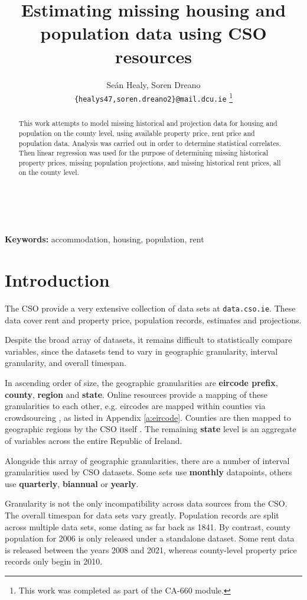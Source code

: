 \documentclass[twocolumn]{article}
\title{Estimating missing housing and population data using CSO resources}
\author{
    Seán Healy, Soren Dreano\\
    \texttt{\{healys47,soren.dreano2\}@mail.dcu.ie}
    \footnote{This work was completed as part of the CA-660 module.}
}
\begin{document}
\maketitle
\begin{abstract}
This work attempts to model missing historical and projection data for
housing and population on the county level, using available
property price, rent price and population data.  Analysis was
carried out in order to determine statistical correlates.  Then linear
regression was used for the purpose of determining missing historical property
prices, missing population projections, and missing historical rent prices,
all on the county level.
\end{abstract}\\\\
{\bf Keywords:} accommodation, housing, population, rent

\section{Introduction\label{s:intro}}
The CSO provide a very extensive collection of data sets at
{\tt data.cso.ie}.  These data cover rent and property price, population
records, estimates and projections.

Despite the broad array of datasets, it remains difficult to statistically
compare variables, since the datasets tend to vary in geographic granularity,
interval granularity, and overall timespan.

In ascending order of size, the geographic granularities are {\bf eircode prefix},
{\bf county}, {\bf region} and {\bf state}.  Online resources provide a mapping of
these granularities to each other, e.g. eircodes are mapped within counties via crowdsourcing
\cite{eircode19}, as listed in Appendix \ref{a:eircode}.  Counties are then mapped to geographic
regions by the CSO itself \cite{cso_regions}.  The remaining {\bf state} level is an aggregate of variables
across the entire Republic of Ireland.

Alongside this array of geographic granularities, there are a number of interval granularities used by CSO
datasets.  Some sets use {\bf monthly} datapoints, others use {\bf quarterly}, {\bf biannual} or {\bf yearly}.

Granularity is not the only incompatibility across data sources from the CSO.
The overall timespan for data sets vary greatly.  Population records are split
across multiple data sets, some dating as far back as 1841.  By contrast,
county population for 2006 is only released under a standalone dataset.  Some
rent data is released between the years 2008 and 2021, whereas county-level
property price records only begin in 2010.
\end{document}
